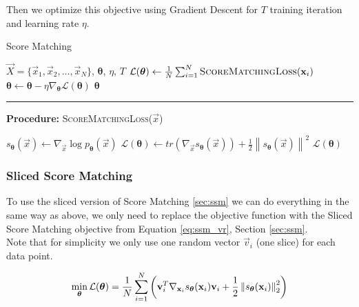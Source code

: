 Then we optimize this objective using Gradient Descent for $T$ training iteration and learning rate $\eta$.  

\begin{algorithm}
    \caption{Score Matching}
    \begin{algorithmic}[1]  
        \Require $\vec X = \{\vec x_1, \vec x_2, ..., \vec x_N\}$, $\boldsymbol{\theta}$, $\eta$, $T$
            \State $\mathcal{L}(\boldsymbol{\theta}) \gets \frac{1}{N} \sum_{i=1}^N \textsc{ScoreMatchingLoss}(\vec x_i)$
            \State $\boldsymbol{\theta} \gets \boldsymbol{\theta} - \eta \nabla_{\boldsymbol{\theta}} \mathcal{L}(\boldsymbol{\theta})$
        \EndFor
        \State \Return $\boldsymbol{\theta}$
        \end{algorithmic}
        \noindent\rule{\linewidth}{0.4pt}
        \textbf{Procedure:} \textsc{ScoreMatchingLoss}($\vec x$)
        \begin{algorithmic}[1]
            \State $s_{\boldsymbol{\theta}}(\vec x) \gets \nabla_{\vec x} \log p_{\boldsymbol{\theta}}(\vec x)$
            \State $\mathcal{L}(\boldsymbol{\theta}) \gets tr(\nabla_{\vec x} s_{\boldsymbol{\theta}}(\vec x)) + \frac{1}{2} \left\| s_{\boldsymbol{\theta}}(\vec x) \right\|^2 $
            \State \Return $\mathcal{L}(\boldsymbol{\theta})$
        \end{algorithmic}
\end{algorithm}

\subsubsection{Sliced Score Matching}
\label{sec:gmm_ssm}

To use the sliced version of Score Matching \ref{sec:ssm} we can do everything in the same way as above, we only need to replace 
the objective function with the Sliced Score Matching objective from Equation \ref{eq:ssm_vr}, Section \ref{sec:ssm}. \\
Note that for simplicity we only use one random vector $\vec v_i$ (one slice) for each data point. 

\begin{equation}
    \min_{\substack{\boldsymbol{\theta}}} \mathcal{L}(\boldsymbol{\theta}) = \frac{1}{N} \sum_{i=1}^{N} \left( \vec{v}_i^T \nabla_{\vec x_i} s_{\boldsymbol{\theta}}(\vec x_i) \vec{v}_i + \frac{1}{2} \norm{  s_{\boldsymbol{\theta}}(\vec x_i) }^2_2 \right)
    \label{eq:ssm_optimization_problem}
\end{equation}

